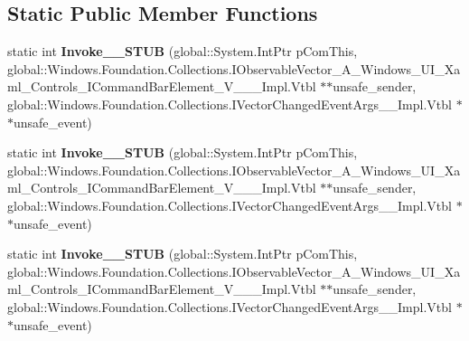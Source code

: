 \subsection*{Static Public Member Functions}
\begin{DoxyCompactItemize}
\item 
\mbox{\label{struct_windows_1_1_foundation_1_1_collections_1_1_vector_changed_event_handler___a___windows___ud3b80c77359cead1f814fa39c92b857f_af67d541f15fac348d7b03bbc8e54eefc}} 
static int {\bfseries Invoke\+\_\+\+\_\+\+S\+T\+UB} (global\+::\+System.\+Int\+Ptr p\+Com\+This, global\+::\+Windows.\+Foundation.\+Collections.\+I\+Observable\+Vector\+\_\+\+A\+\_\+\+Windows\+\_\+\+U\+I\+\_\+\+Xaml\+\_\+\+Controls\+\_\+\+I\+Command\+Bar\+Element\+\_\+\+V\+\_\+\+\_\+\+\_\+\+Impl.\+Vtbl $\ast$$\ast$unsafe\+\_\+sender, global\+::\+Windows.\+Foundation.\+Collections.\+I\+Vector\+Changed\+Event\+Args\+\_\+\+\_\+\+Impl.\+Vtbl $\ast$$\ast$unsafe\+\_\+event)
\item 
\mbox{\label{struct_windows_1_1_foundation_1_1_collections_1_1_vector_changed_event_handler___a___windows___ud3b80c77359cead1f814fa39c92b857f_af67d541f15fac348d7b03bbc8e54eefc}} 
static int {\bfseries Invoke\+\_\+\+\_\+\+S\+T\+UB} (global\+::\+System.\+Int\+Ptr p\+Com\+This, global\+::\+Windows.\+Foundation.\+Collections.\+I\+Observable\+Vector\+\_\+\+A\+\_\+\+Windows\+\_\+\+U\+I\+\_\+\+Xaml\+\_\+\+Controls\+\_\+\+I\+Command\+Bar\+Element\+\_\+\+V\+\_\+\+\_\+\+\_\+\+Impl.\+Vtbl $\ast$$\ast$unsafe\+\_\+sender, global\+::\+Windows.\+Foundation.\+Collections.\+I\+Vector\+Changed\+Event\+Args\+\_\+\+\_\+\+Impl.\+Vtbl $\ast$$\ast$unsafe\+\_\+event)
\item 
\mbox{\label{struct_windows_1_1_foundation_1_1_collections_1_1_vector_changed_event_handler___a___windows___ud3b80c77359cead1f814fa39c92b857f_af67d541f15fac348d7b03bbc8e54eefc}} 
static int {\bfseries Invoke\+\_\+\+\_\+\+S\+T\+UB} (global\+::\+System.\+Int\+Ptr p\+Com\+This, global\+::\+Windows.\+Foundation.\+Collections.\+I\+Observable\+Vector\+\_\+\+A\+\_\+\+Windows\+\_\+\+U\+I\+\_\+\+Xaml\+\_\+\+Controls\+\_\+\+I\+Command\+Bar\+Element\+\_\+\+V\+\_\+\+\_\+\+\_\+\+Impl.\+Vtbl $\ast$$\ast$unsafe\+\_\+sender, global\+::\+Windows.\+Foundation.\+Collections.\+I\+Vector\+Changed\+Event\+Args\+\_\+\+\_\+\+Impl.\+Vtbl $\ast$$\ast$unsafe\+\_\+event)

\end{DoxyCompactItemize}

